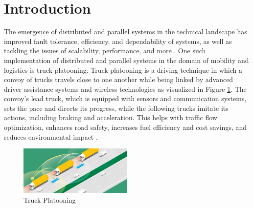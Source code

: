 \section{Introduction}
\label{sec:intoduction}
The emergence of distributed and parallel systems in the technical landscape has improved fault tolerance, efficiency, and dependability of systems, as well as tackling the issues of scalability, performance, and more \cite{b1}. One such implementation of distributed and parallel systems in the domain of mobility and logistics is truck platooning. Truck platooning is a driving technique in which a convoy of trucks travels close to one another while being linked by advanced driver assistance systems and wireless technologies as visualized in Figure \ref{img:truckplatooning}. The convoy's lead truck, which is equipped with sensors and communication systems, sets the pace and directs its progress, while the following trucks imitate its actions, including braking and acceleration. This helps with traffic flow optimization, enhances road safety, increases fuel efficiency and cost savings, and reduces environmental impact \cite{b2}. 
\begin{figure}[ht]
    \centering
    \includegraphics[width=0.5\textwidth]{images/truckplatooning.jpg}
    \caption{Truck Platooning \cite{b3}}
    \label{img:truckplatooning}
\end{figure}
